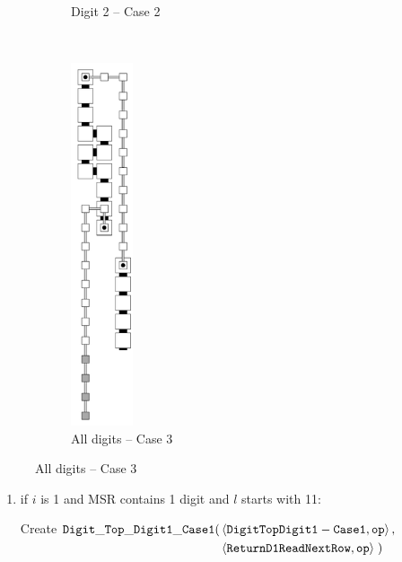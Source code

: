 \begin{itemize}
\begin{figure}[H]
\begin{subfigure}[t]{0.2\textwidth}
            \caption{\label{fig:digit_tops/digit_top_case2_digit2_msr} Digit 2 -- Case 2}
        \end{subfigure}%
        ~
        \begin{subfigure}[t]{0.2\textwidth}
            \centering
            \includegraphics[width=0.2\textwidth]{digit_tops/digit_top_case3_msr}
            \caption{\label{fig:digit_tops/digit_top_case3_msr} All digits -- Case 3}
        \end{subfigure}%
    \end{figure}


    \begin{enumerate}[label=\alph*)]
        \item if $i$ is 1 and MSR contains 1 digit and $l$ starts with 11:

        Create
        $\begin{aligned}[t]
            {\tt Digit\_Top\_Digit1\_Case1}(& \left \langle {\tt DigitTopDigit1-Case1}, {\tt op} \right\rangle, & \\
                                & \left \langle {\tt ReturnD1ReadNextRow},  {\tt op} \right\rangle \;)
        \end{aligned}$
        \vspace{.5cm}



\end{enumerate}
\end{itemize}
